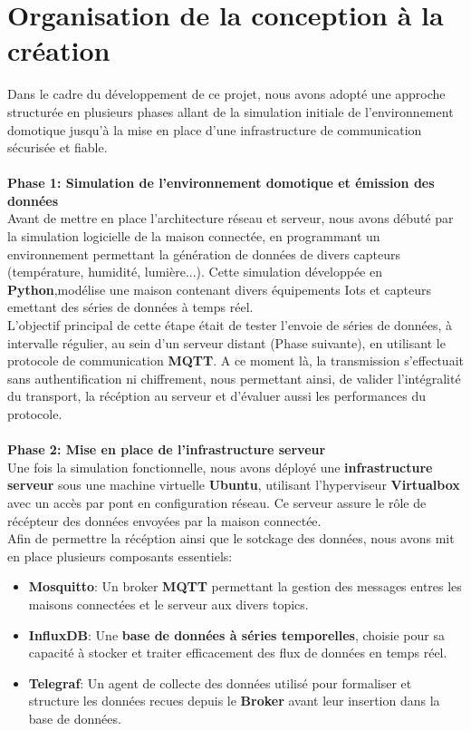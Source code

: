 \documentclass[10pt, a4paper]{report}
\begin{document}
	\section{Organisation de la conception à la création}
	Dans le cadre du développement de ce projet, nous avons adopté une approche structurée en plusieurs phases allant de la simulation initiale de l'environnement domotique jusqu'à la mise en place d'une infrastructure de communication sécurisée et fiable.\\\\
	\textbf{Phase 1: Simulation de l'environnement domotique et émission des données}\\
	Avant de mettre en place l'architecture réseau et serveur, nous avons débuté par la simulation logicielle de la maison connectée, en programmant un environnement permettant la génération de données de divers capteurs (température, humidité, lumière...). Cette simulation développée en \textbf{Python},modélise une maison contenant divers équipements Iots et capteurs emettant des séries de données à temps réel.\\
	L'objectif principal de cette étape était de tester l'envoie de séries de données, à intervalle régulier, au sein d'un serveur distant (Phase suivante), en utilisant le protocole de communication \textbf{MQTT}. A ce moment là, la transmission s'effectuait sans authentification ni chiffrement, nous permettant ainsi, de valider l'intégralité du transport, la récéption au serveur et d'évaluer aussi les performances du protocole. \\\\
	\textbf{Phase 2: Mise en place de l'infrastructure serveur}\\
	Une fois la simulation fonctionnelle, nous avons déployé une \textbf{infrastructure serveur} sous une machine virtuelle \textbf{Ubuntu}, utilisant l'hyperviseur \textbf{Virtualbox} avec un accès par pont en configuration réseau. Ce serveur assure le rôle de récépteur des données envoyées par la maison connectée.\\
	Afin de permettre la récéption ainsi que le sotckage des données, nous avons mit en place plusieurs composants essentiels:\\
	\begin{itemize}
		\item \textbf{Mosquitto}: Un broker \textbf{MQTT} permettant la gestion des messages entres les maisons connectées et le serveur aux divers topics.
		\item \textbf{InfluxDB}: Une \textbf{base de données à séries temporelles}, choisie pour sa capacité à stocker et traiter efficacement des flux de données en temps réel.
		\item \textbf{Telegraf}: Un agent de collecte des données utilisé pour formaliser et structure les données recues depuis le \textbf{Broker} avant leur insertion dans la base de données.
	\end{itemize}
\end{document}
